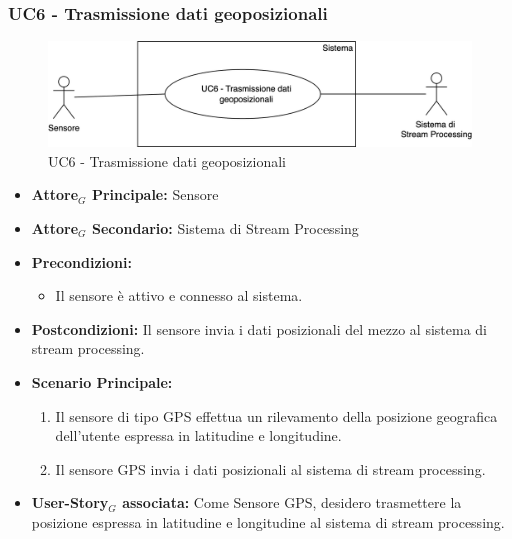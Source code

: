 \documentclass[11pt]{article}
\begin{document}
\begin{justify}
\subsubsection{\textbf{UC6 - Trasmissione dati geoposizionali}}
\begin{figure}[H]
    \centering
    \includegraphics[width=0.7\linewidth]{UC6image.png}
    \caption{UC6 - Trasmissione dati geoposizionali}
    \label{fig:UC6}
\end{figure}
\label{UC6}
\begin{itemize}
    \item \textbf{Attore$_G$ Principale:} Sensore
    \item \textbf{Attore$_G$ Secondario:} Sistema di Stream Processing
    \item \textbf{Precondizioni:} 
        \begin{itemize}
    	\item Il sensore è attivo e connesso al sistema.
        \end{itemize}
    \item \textbf{Postcondizioni:} Il sensore invia i dati posizionali del mezzo al sistema di stream processing.
    \item \textbf{Scenario Principale:} 
        \begin{enumerate}
            \item Il sensore di tipo GPS effettua un rilevamento della posizione geografica dell'utente espressa in latitudine e longitudine.
            \item Il sensore GPS invia i dati posizionali al sistema di stream processing.
        \end{enumerate}
    \item \textbf{User-Story$_G$ associata:} Come Sensore GPS, desidero trasmettere la posizione espressa in latitudine e longitudine al sistema di stream processing.

\end{itemize}



\end{justify}
\end{document}
